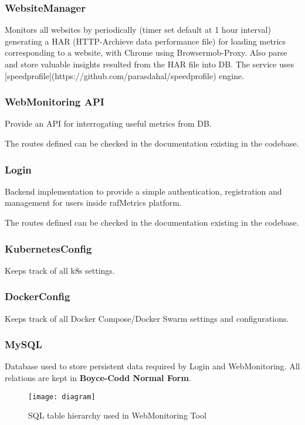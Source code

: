 \subsubsection{WebsiteManager}
Monitors all websites by periodically (timer set default at 1 hour interval) generating a HAR (HTTP-Archieve data performance file) for loading metrics corresponding to a website, with Chrome using Browsermob-Proxy.
Also parse and store valuable insights resulted from the HAR file into DB. 
The service uses [speedprofile](https://github.com/parasdahal/speedprofile) engine.

\subsubsection{WebMonitoring API}
Provide an API for interrogating useful metrics from DB.

The routes defined can be checked in the documentation existing in the codebase.


\subsubsection{Login}
Backend implementation to provide a simple authentication, registration and management for users inside rafMetrics platform.

The routes defined can be checked in the documentation existing in the codebase.


\subsubsection{KubernetesConfig}
Keeps track of all k8s settings.

\subsubsection{DockerConfig}
Keeps track of all Docker Compose/Docker Swarm settings and configurations.

\subsubsection{MySQL}
Database used to store persistent data required by Login and WebMonitoring.
All relations are kept in \textbf{Boyce-Codd Normal Form}.

\begin{figure}[H]
\centering
\texttt{[image: diagram]}
\caption{SQL table hierarchy used in WebMonitoring Tool}
\end{figure}

